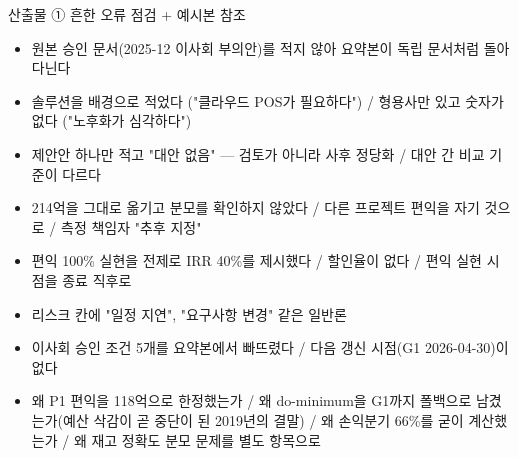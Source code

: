 \begin{frame}[allowframebreaks=1.0]{산출물 ① 흔한 오류 점검 + 예시본 참조}
\small
\par\smallskip{}\nobreak
\begin{itemize}
\item[$\square$]\relax 원본 승인 문서(2025-12 이사회 부의안)를 적지 않아 요약본이 독립 문서처럼 돌아다닌다
\item[$\square$]\relax 솔루션을 배경으로 적었다 ("클라우드 POS가 필요하다") / 형용사만 있고 숫자가 없다 ("노후화가 심각하다")
\item[$\square$]\relax 제안안 하나만 적고 "대안 없음" — 검토가 아니라 사후 정당화 / 대안 간 비교 기준이 다르다
\item[$\square$]\relax 214억을 그대로 옮기고 분모를 확인하지 않았다 / 다른 프로젝트 편익을 자기 것으로 / 측정 책임자 "추후 지정"
\item[$\square$]\relax 편익 100\% 실현을 전제로 IRR 40\%를 제시했다 / 할인율이 없다 / 편익 실현 시점을 종료 직후로
\item[$\square$]\relax 리스크 칸에 "일정 지연", "요구사항 변경" 같은 일반론
\item[$\square$]\relax 이사회 승인 조건 5개를 요약본에서 빠뜨렸다 / 다음 갱신 시점(G1 2026-04-30)이 없다
\end{itemize}
\par\smallskip{}\nobreak
\begin{itemize}
\item\relax 왜 P1 편익을 118억으로 한정했는가 / 왜 do-minimum을 G1까지 폴백으로 남겼는가(예산 삭감이 곧 중단이 된 2019년의 결말) / 왜 손익분기 66\%를 굳이 계산했는가 / 왜 재고 정확도 분모 문제를 별도 항목으로
\end{itemize}
\par\smallskip{}\nobreak
{}
\end{frame}

